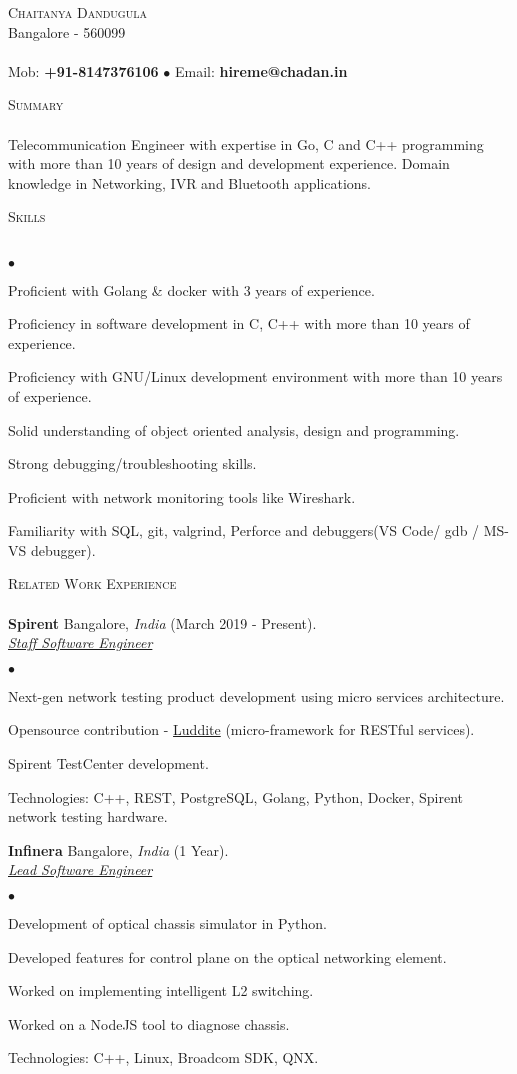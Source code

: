 \documentclass[a4paper]{article}
\newcommand{\lineunder}{\vspace*{-8pt} \\ \hspace*{-18pt} \hrulefill \\}
\newcommand{\header}[1]{{\hspace*{-15pt}\vspace*{6pt} \textsc{#1}} \vspace*{-6pt} \lineunder}
\newcommand{\employer}[4]{{ \textbf{#1} #2  (#3).\\ \underline{\emph{#4}}\\  }}
\newcommand{\contact}[3]{
\vspace*{-8pt}
\begin{center}
{\LARGE \scshape {#1}}\\
#2 \lineunder
#3
\end{center}
\vspace*{-8pt}
}
\newenvironment{achievements}{\begin{list}{$\bullet$}{\topsep 0pt \itemsep -2pt}}{\vspace*{4pt}\end{list}}
\begin{document}
\small
\smallskip
\contact{Chaitanya Dandugula}
{Bangalore - 560099}
{Mob: \textbf{+91-8147376106} $\bullet$ Email: \textbf{hireme@chadan.in}}
\vspace*{5pt}

\header{Summary}
Telecommunication Engineer with expertise in Go, C and C++ programming with more than 10 years of design and development experience.
Domain knowledge in Networking, IVR and Bluetooth applications.

\header{Skills}
\begin{achievements}
\item Proficient with Golang \& docker with 3 years of experience.
\item Proficiency in software development in C, C++ with more than 10 years of experience.
\item Proficiency with GNU/Linux development environment with more than 10 years of experience.
\item Solid understanding of object oriented analysis, design and programming.
\item Strong debugging/troubleshooting skills.
\item Proficient with network monitoring tools like Wireshark.
\item Familiarity with SQL, git, valgrind, Perforce and debuggers(VS Code/ gdb / MS-VS debugger).
\end{achievements}

\header{Related Work Experience}
\employer{Spirent} {Bangalore, \textit{India}} {March 2019 - Present} {Staff Software Engineer}
	\begin{achievements}
          \item Next-gen network testing product development using micro services architecture. 
          \item Opensource contribution - \href{https://github.com/SpirentOrion/luddite.v2}{Luddite} (micro-framework for RESTful services).
          \item Spirent TestCenter development.
          \item Technologies: C++, REST, PostgreSQL, Golang, Python, Docker, Spirent network testing hardware.
	\end{achievements}
\employer{Infinera} {Bangalore, \textit{India}} {1 Year} {Lead Software Engineer}
	\begin{achievements}
          \item Development of optical chassis simulator in Python. 
          \item Developed features for control plane on the optical networking element.
          \item Worked on implementing intelligent L2 switching.
          \item Worked on a NodeJS tool to diagnose chassis.
          \item Technologies: C++, Linux, Broadcom SDK, QNX.
	\end{achievements}
\end{document}
